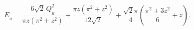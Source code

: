 \begin{equation}
E_{_{B}}=\frac{6\sqrt{2}\,Q_{_{B}}^{2}}{\pi z\left( \pi
^{2}+z^{2}\right) }+ \frac{\pi z\left( \pi ^{2}+z^{2}\right)
}{12\sqrt{2}}+\frac{\sqrt{2}\pi }{4} \left( \frac{\pi
^{2}+3z^{2}}{6}+z\right) .
\end{equation}

